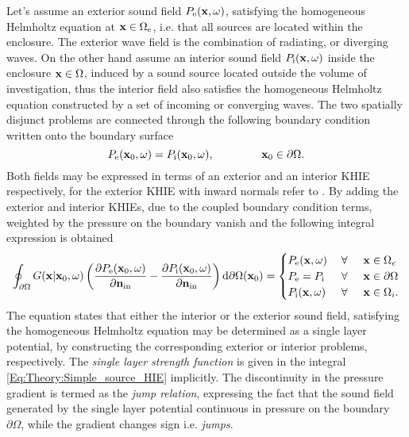 Let's assume an exterior sound field $P_{\mathrm{e}}(\mathbf{x},\omega)$, satisfying the homogeneous Helmholtz equation at $\mathbf{x} \in \Omega_{\mathrm{e}}$, i.e. that all sources are located within the enclosure. The exterior wave field is the combination of radiating, or diverging waves. On the other hand assume an interior sound field $P_{\mathrm{i}}(\mathbf{x},\omega)$ inside the enclosure $\mathbf{x} \in \Omega$, induced by a sound source located outside the volume of investigation, thus the interior field also satisfies the homogeneous Helmholtz equation constructed by a set of incoming or converging waves.
The two spatially disjunct problems are connected through the following boundary condition written onto the boundary surface
\begin{equation}
P_{\mathrm{e}}(\vxo,\omega) = P_{\mathrm{i}}(\vxo,\omega), \hspace{15mm} \vxo \in \partial \Omega.
\end{equation}
Both fields may be expressed in terms of an exterior and an interior KHIE respectively, for the exterior KHIE with inward normals refer to \cite[eq. 8.30]{Williams1999}.
By adding the exterior and interior KHIEs, due to the coupled boundary condition terms, weighted by the pressure on the boundary vanish and the following integral expression is obtained \cite[p.~268.]{Williams1999}
\begin{equation}
\oint_{\partial \Omega} 
G(\mathbf{x}|\mathbf{x}_0,\omega) 
\left(
\frac{\partial P_{\mathrm{e}}(\mathbf{x}_0,\omega)}{\partial \mathbf{n}_{\mathrm{in}}} - \frac{\partial P_{\mathrm{i}}(\mathbf{x}_0,\omega)}{\partial \mathbf{n}_{\mathrm{in}}} 
\right)
\mathrm{d} \partial \Omega ( \mathbf{x}_0)
= 
\begin{cases} 
P_{\mathrm{e}}(\mathbf{x},\omega)           & \hspace{1mm} \forall \hspace{5mm}  \mathbf{x} \in \Omega_e  	   \\
P_{\mathrm{e}}=P_{\mathrm{i}} & \hspace{1mm} \forall \hspace{5mm}         \mathbf{x} \in \partial \Omega  \\
P_{\mathrm{i}}(\mathbf{x},\omega) 			& \hspace{1mm} \forall \hspace{5mm}   \mathbf{x} \in \Omega_i.
\end{cases}
\label{Eq:Theory:Simple_source_HIE}
\end{equation}
The equation states that either the interior or the exterior sound field, satisfying the homogeneous Helmholtz equation may be determined as a single layer potential, by constructing the corresponding exterior or interior problems, respectively.
The \emph{single layer strength function} is given in the integral \eqref{Eq:Theory:Simple_source_HIE} implicitly.
The discontinuity in the pressure gradient is termed as the \emph{jump relation}, expressing the fact that the sound field generated by the single layer potential continuous in pressure on the boundary $\partial \Omega$, while the gradient changes sign i.e. \emph{jumps}.

